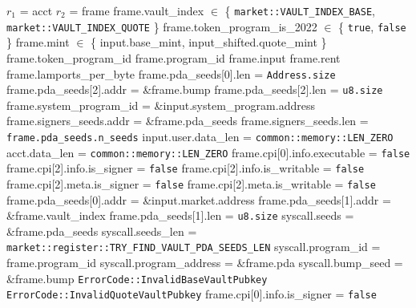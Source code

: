 \begin{algorithm}
\caption{INIT-VAULT}
\begin{algorithmic}
  \INPUT $r_1$ = acct
  \INPUT $r_2$ = frame
  \REQUIRE frame.vault\_index $\in$ \{
    \texttt{market::VAULT\_INDEX\_BASE},
    \texttt{market::VAULT\_INDEX\_QUOTE}
  \}
  \REQUIRE frame.token\_program\_is\_2022 $\in$ \{
    \texttt{true},
    \texttt{false}
  \}
  \REQUIRE frame.mint $\in$ \{
    input.base\_mint,
    input\_shifted.quote\_mint
  \}
  \REQUIRE frame.token\_program\_id
  \REQUIRE frame.program\_id
  \REQUIRE frame.input
  \REQUIRE frame.rent
  \REQUIRE frame.lamports\_per\_byte
  \REQUIRE frame.pda\_seeds[0].len = \texttt{Address.size}
  \REQUIRE frame.pda\_seeds[2].addr = \&frame.bump
  \REQUIRE frame.pda\_seeds[2].len = \texttt{u8.size}
  \REQUIRE frame.system\_program\_id = \&input.system\_program.address
  \REQUIRE frame.signers\_seeds.addr = \&frame.pda\_seeds
  \REQUIRE frame.signers\_seeds.len = \texttt{frame.pda\_seeds.n\_seeds}
  \REQUIRE input.user.data\_len = \texttt{common::memory::LEN\_ZERO}
  \REQUIRE acct.data\_len = \texttt{common::memory::LEN\_ZERO}
  \REQUIRE frame.cpi[0].info.executable = \texttt{false}
  \REQUIRE frame.cpi[2].info.is\_signer = \texttt{false}
  \REQUIRE frame.cpi[2].info.is\_writable = \texttt{false}
  \REQUIRE frame.cpi[2].meta.is\_signer = \texttt{false}
  \REQUIRE frame.cpi[2].meta.is\_writable = \texttt{false}
  \STATE {}
  \STATE {}
  \STATE frame.pda\_seeds[0].addr = \&input.market.address
  \STATE frame.pda\_seeds[1].addr = \&frame.vault\_index
  \STATE frame.pda\_seeds[1].len = \texttt{u8.size}
  \STATE syscall.seeds = \&frame.pda\_seeds
  \STATE syscall.seeds\_len = \texttt{market::register::TRY\_FIND\_VAULT\_PDA\_SEEDS\_LEN}
  \STATE syscall.program\_id = frame.program\_id
  \STATE syscall.program\_address = \&frame.pda
  \STATE syscall.bump\_seed = \&frame.bump
  \STATE {}
      \RETURN \texttt{ErrorCode::InvalidBaseVaultPubkey}
    \ELSE
      \RETURN \texttt{ErrorCode::InvalidQuoteVaultPubkey}
    \ENDIF
  \ENDIF
    \STATE frame.cpi[0].info.is\_signer = \texttt{false}

\end{algorithmic}
\end{algorithm}
